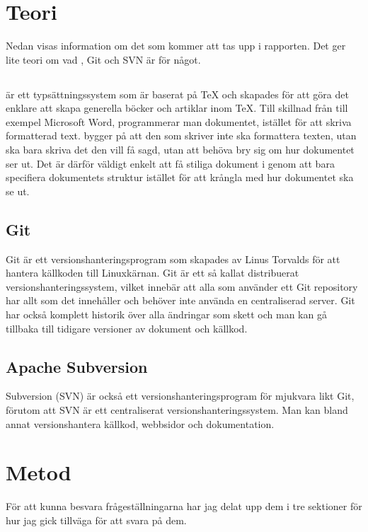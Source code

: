 \section{Teori}
\label{sec:theory-tuhkala}
Nedan visas information om det som kommer att tas upp i rapporten. Det ger lite teori om vad \latex, Git och SVN är för något.

\subsection{\latex}
\latex är ett typsättningssystem som är baserat på TeX och skapades för att göra det enklare att skapa generella böcker och artiklar inom TeX. Till skillnad från till exempel Microsoft Word, programmerar man dokumentet, istället för att skriva formatterad text. \latex bygger på att den som skriver inte ska formattera texten, utan ska bara skriva det den vill få sagd, utan att behöva bry sig om hur dokumentet ser ut. Det är därför väldigt enkelt att få stiliga dokument i \latex genom att bara specifiera dokumentets struktur istället för att krångla med hur dokumentet ska se ut.

\subsection{Git}
Git är ett versionshanteringsprogram som skapades av Linus Torvalds för att hantera källkoden till Linuxkärnan. Git är ett så kallat distribuerat versionshanteringssystem, vilket innebär att alla som använder ett Git repository har allt som det innehåller och behöver inte använda en centraliserad server. Git har också komplett historik över alla ändringar som skett och man kan gå tillbaka till tidigare versioner av dokument och källkod.

\subsection{Apache Subversion}
Subversion (SVN) är också ett versionshanteringsprogram för mjukvara likt Git, förutom att SVN är ett centraliserat versionshanteringssystem. Man kan bland annat versionshantera källkod, webbsidor och dokumentation. 

\section{Metod}
\label{sec:method-tuhkala}
För att kunna besvara frågeställningarna har jag delat upp dem i tre sektioner för hur jag gick tillväga för att svara på dem.

